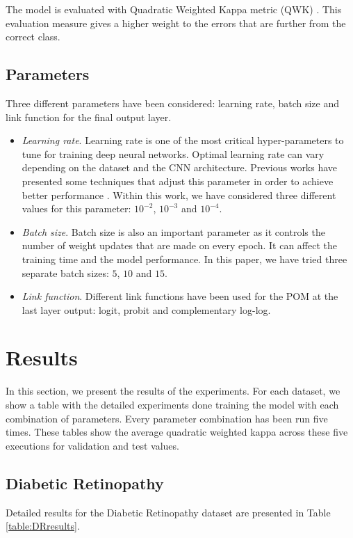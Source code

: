 \documentclass[10pt, a4paper, titlepage, twocolumn]{article}
\begin{document}
	The model is evaluated with Quadratic Weighted Kappa metric (QWK) \cite{ben2008comparison}. This evaluation measure gives a higher weight to the errors that are further from the correct class.
	
	\subsection{Parameters}
	Three different parameters have been considered: learning rate, batch size and link function for the final output layer.
	
	\begin{itemize}
		\item \textit{Learning rate}. Learning rate is one of the most critical hyper-parameters to tune for training deep neural networks. Optimal learning rate can vary depending on the dataset and the CNN architecture. Previous works have presented some techniques that adjust this parameter in order to achieve better performance \cite{smith2017cyclical}\cite{senior2013empirical}. Within this work, we have considered three different values for this parameter: $10^{-2}$, $10^{-3}$ and $10^{-4}$.
		\item \textit{Batch size}. Batch size is also an important parameter as it controls the number of weight updates that are made on every epoch. It can affect the training time and the model performance. In this paper, we have tried three separate batch sizes: $5$, $10$ and $15$.
		\item \textit{Link function}. Different link functions have been used for the POM at the last layer output: logit, probit and complementary log-log.
	\end{itemize}
	
	\section{Results}
	\label{sect:results}
	In this section, we present the results of the experiments. For each dataset, we show a table with the detailed experiments done training the model with each combination of parameters. Every parameter combination has been run five times. These tables show the average quadratic weighted kappa across these five executions for validation and test values.
	
	\subsection{Diabetic Retinopathy}
	Detailed results for the Diabetic Retinopathy dataset are presented in Table \ref{table:DRresults}.
	
\end{document}
